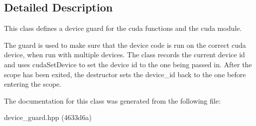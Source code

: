 \subsection{Detailed Description}
This class defines a device guard for the cuda functions and the cuda module. 

The guard is used to make sure that the device code is run on the correct cuda device, when run with multiple devices. The class records the current device id and uses {\ttfamily cuda\+Set\+Device} to set the device id to the one being passed in. After the scope has been exited, the destructor sets the device\+\_\+id back to the one before entering the scope. 

The documentation for this class was generated from the following file\+:\begin{DoxyCompactItemize}
\item 
device\+\_\+guard.\+hpp (4633d6a)\end{DoxyCompactItemize}
